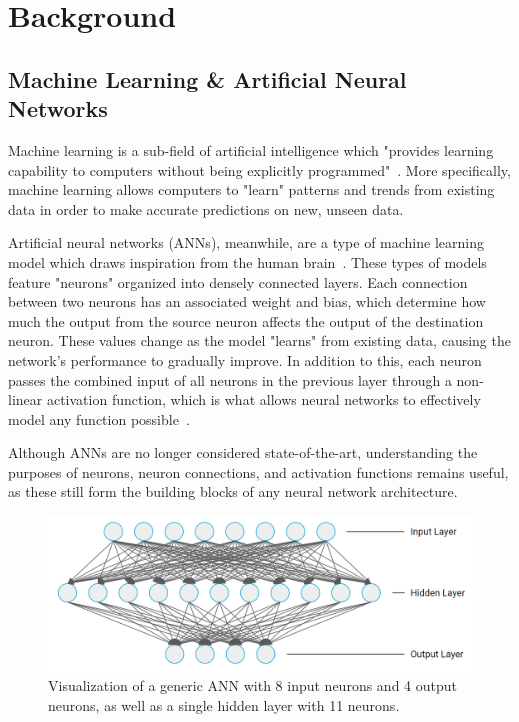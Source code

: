 \section{Background}\label{sec:background}
\subsection{Machine Learning \& Artificial Neural Networks}\label{subsec:machine-learning-and-neural-networks}
Machine learning is a sub-field of artificial intelligence which "provides learning capability to computers
without being explicitly programmed"~\cite{Alzubi_2018}.
More specifically, machine learning allows computers to "learn" patterns and trends from existing data in order to make accurate predictions on new, unseen data.

Artificial neural networks (ANNs), meanwhile, are a type of machine learning model which draws inspiration from the human brain~\cite{Wang2003}.
These types of models feature "neurons" organized into densely connected layers.
Each connection between two neurons has an associated weight and bias, which determine how much the output from the source neuron affects the output of the destination neuron.
These values change as the model "learns" from existing data, causing the network's performance to gradually improve.
In addition to this, each neuron passes the combined input of all neurons in the previous layer through a non-linear activation function, which is what allows neural networks to effectively model any function possible~\cite{Wang2003}.

Although ANNs are no longer considered state-of-the-art, understanding the purposes of neurons, neuron connections, and activation functions remains useful, as these still form the building blocks of any neural network architecture.

\begin{figure}[h]
    \centering
    \captionsetup{justification=centering}
    \includegraphics[width=\linewidth]{figures/ann}
    \caption{Visualization of a generic ANN with 8 input neurons and 4 output neurons, as well as a single hidden layer with 11 neurons.}
    \label{fig:ann}
\end{figure}

